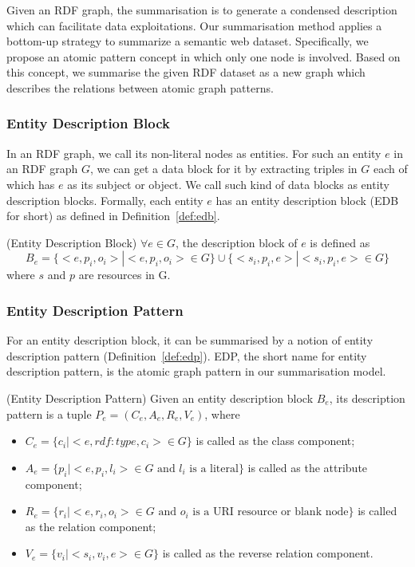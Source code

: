 Given an RDF graph, the summarisation is to generate a condensed description which can facilitate data exploitations. Our summarisation method applies a bottom-up strategy to summarize a semantic web dataset. Specifically, we propose an atomic pattern concept in which only one node is involved. Based on this concept, we summarise the given RDF dataset as a new graph which describes the relations between atomic graph patterns.

\vspace{-3ex}
\subsubsection{Entity Description Block}
In an RDF graph, we call its non-literal nodes as entities. For such an entity $e$ in an RDF graph $G$, we can get a data block for it by extracting triples in $G$ each of which has $e$ as its subject or object. We call such kind of data blocks as entity description blocks. Formally, each entity $e$ has an entity description block (EDB for short) as defined in Definition~\ref{def:edb}.

\begin{definition}
\label{def:edb}
 (Entity Description Block)
$\forall e \in G$, the description block of $e$ is defined as 
\begin{equation}
B_e= \{<e,p_i,o_i>|<e,p_i,o_i> \in G\} \cup \{<s_i,p_i,e>|<s_i,p_i,e> \in G\}
\end{equation}
where $s$ and $p$ are resources in G.
\end{definition}

\vspace{-5ex}
\subsubsection{Entity Description Pattern}
For an entity description block, it can be summarised by a notion of entity description pattern (Definition~\ref{def:edp}). EDP, the short name for entity description pattern, is the atomic graph pattern in our summarisation model. 

\begin{definition}
\label{def:edp} 
(Entity Description Pattern) Given an entity description block $B_e$, its description pattern is a tuple $P_e=(C_e,A_e,R_e,V_e)$, where
\begin{itemize}
\item $C_e=\{c_i |<e,rdf:type,c_i> \in G\}$   is called as the class component; 
\item $A_e=\{p_i |<e,p_i,l_i> \in G \text{ and $l_i$  is a literal}\}$  is called as the attribute component;
\item $R_e=\{r_i |<e,r_i,o_i> \in G \text{ and $o_i$  is a URI resource or blank node}\}$  is called as the relation component;
\item $V_e=\{v_i |<s_i,v_i,e> \in G\}$ is called as the reverse relation component.
\end{itemize}
\end{definition}

